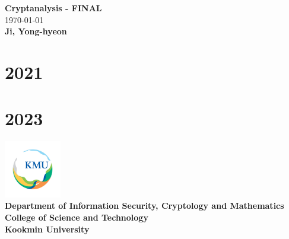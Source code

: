 \documentclass[11pt,openany]{article}
\newcommand{\footer}[1]{
\begin{flushright}
	\vspace{2em}
	\includegraphics[width=2.5cm]{school_logo.jpg} \\
	\vspace{1em}
	\textcolor{TealBlue2}{\small\textbf{#1}}
\end{flushright}
}
\begin{document}
\begin{center}
	\huge\textbf{Cryptanalysis - FINAL}\\
	\vspace{0.5em}
	\normalsize{\today}\\
	\vspace{0.5em}
	\large\textbf{Ji, Yong-hyeon}\\
	\vspace{0.5em}
\end{center}

\section{2021}


%

\newpage
\section{2023}


\footer{Department of Information Security, Cryptology and Mathematics\\
	College of Science and Technology\\
	Kookmin University}

\newpage
%
%
%
\end{document}
